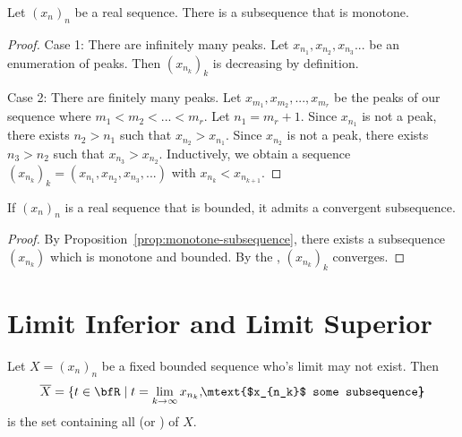     \begin{proposition}\label{prop:monotone-subsequence}
        Let $(x_n)_n$ be a real sequence. There is a subsequence that is monotone.
    \end{proposition}
        \begin{proof}
            Case 1: There are infinitely many peaks. Let $x_{n_1},x_{n_2},x_{n_3}...$ be an enumeration of peaks. Then $(x_{n_k})_k$ is decreasing by definition.

            Case 2: There are finitely many peaks. Let $x_{m_1},x_{m_2},...,x_{m_r}$ be the peaks of our sequence where $m_1 < m_2 < ... < m_r$. Let $n_1 = m_r + 1$. Since $x_{n_1}$ is not a peak, there exists $n_2 > n_1$ such that $x_{n_2} > x_{n_1}$. Since $x_{n_2}$ is not a peak, there exists $n_3 > n_2$ such that $x_{n_3} > x_{n_2}$. Inductively, we obtain a sequence $(x_{n_k})_k = (x_{n_1},x_{n_2},x_{n_3},...)$ with $x_{n_k} < x_{n_{k+1}}$.
        \end{proof}

    \begin{theorem}
        If $(x_n)_n$ is a real sequence that is bounded, it admits a convergent subsequence.
    \end{theorem}
        \begin{proof}
            By Proposition~\ref{prop:monotone-subsequence}, there exists a subsequence $(x_{n_k})$ which is monotone and bounded. By the , $(x_{n_k})_k$ converges.
        \end{proof}

\section{Limit Inferior and Limit Superior}
    \begin{definition}
        Let $X = (x_n)_n$ be a fixed bounded sequence who's limit may not exist. Then
            \begin{equation*}
            \begin{split}
                \overline{X} = \{t \in \bfR \mid t = \lim_{k \rightarrow \infty}x_{n_k}, \hspace{-3pt}\mtext{$x_{n_k}$ some subsequence} \hspace{-5pt}\}
            \end{split}
            \end{equation*}
        is the set containing all  (or ) of $X$.
    \end{definition}

